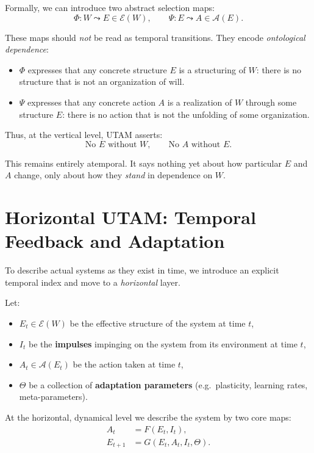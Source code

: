\documentclass[12pt,a4paper]{report}
\newcommand{\Will}{W}
\begin{document}
Formally, we can introduce two abstract selection maps:
\[
    \Phi : \Will \leadsto E \in \mathcal{E}(\Will),
    \qquad
    \Psi : E \leadsto A \in \mathcal{A}(E).
\]

These maps should \emph{not} be read as temporal transitions. They encode \emph{ontological dependence}:

\begin{itemize}[leftmargin=2em]
    \item \(\Phi\) expresses that any concrete structure \(E\) is a structuring of \(\Will\): there is no structure that is not an organization of will.
    \item \(\Psi\) expresses that any concrete action \(A\) is a realization of \(\Will\) through some structure \(E\): there is no action that is not the unfolding of some organization.
\end{itemize}

Thus, at the vertical level, UTAM asserts:
\[
    \text{No } E \text{ without } \Will, \qquad
    \text{No } A \text{ without } E.
\]

This remains entirely atemporal. It says nothing yet about how particular \(E\) and \(A\) change, only about how they \emph{stand} in dependence on \(\Will\).

\section{Horizontal UTAM: Temporal Feedback and Adaptation}

To describe actual systems as they exist in time, we introduce an explicit temporal index and move to a \emph{horizontal} layer.

Let:

\begin{itemize}[leftmargin=2em]
    \item \(E_t \in \mathcal{E}(\Will)\) be the effective structure of the system at time \(t\),
    \item \(I_t\) be the \textbf{impulses} impinging on the system from its environment at time \(t\),
    \item \(A_t \in \mathcal{A}(E_t)\) be the action taken at time \(t\),
    \item \(\Theta\) be a collection of \textbf{adaptation parameters} (e.g.\ plasticity, learning rates, meta-parameters).
\end{itemize}

At the horizontal, dynamical level we describe the system by two core maps:
\begin{equation}
\begin{aligned}
    A_t &= F(E_t, I_t), \\
    E_{t+1} &= G(E_t, A_t, I_t, \Theta).
\end{aligned}
\label{eq:horizontal-utam}
\end{equation}
\end{document}
